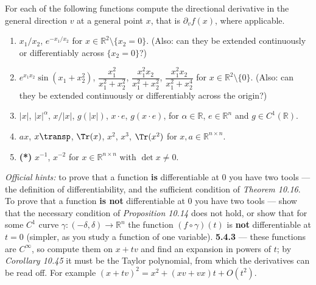 \begin{exercise}
\label{ex:5.4}
For each of the following functions compute the directional derivative in the general direction
$v$ at a general point $x$, that is $\partial_v f(x)$, where applicable.
\begin{enumerate}[label=\textbf{\arabic*.}]
  \item $x_1/x_2$, $e^{-x_1/x_2}$ for $x \in \mathbb{R}^2\setminus\{x_2 = 0\}$. (Also: can they be
    extended continuously or differentiably across $\{x_2 = 0\}$?)
  \item $e^{x_1x_2}\sin(x_1+x_2^2)$, $\dfrac{x_1^2}{x_1^2+x_2^2}$,
    $\dfrac{x_1^2x_2}{x_1^2+x_2^2}$, $\dfrac{x_1^2x_2}{x_1^2+x_2^4}$ for
    $x \in \mathbb{R}^2\setminus\{0\}$. (Also: can they be extended continuously or
    differentiably across the origin?)
  \item $|x|$, $|x|^\alpha$, $x/|x|$, $g(|x|)$, $x\cdot e$, $g(x\cdot e)$, for
    $\alpha \in \mathbb{R}$, $e \in \mathbb{R}^n$ and $g \in C^1(\mathbb{R})$.
  \item $ax$, $x\transp$, $\Tr(x)$, $x^2$, $x^3$, $\Tr(x^2)$ for $x, a \in \mathbb{R}^{n\times n}$.
  \item \textbf{(*)} $x^{-1}$, $x^{-2}$ for $x \in \mathbb{R}^{n\times n}$ with $\det x \neq 0$.
\end{enumerate}
\textit{Official hints:} to prove that a function \textbf{is} differentiable at 0 you have two
tools --- the definition of differentiability, and the sufficient condition of
\textit{Theorem 10.16}. To prove that a function \textbf{is not} differentiable at 0 you have
two tools --- show that the necessary condition of \textit{Proposition 10.14} does not hold, or
show that for some $C^1$ curve $\gamma : (-\delta,\delta)\to\mathbb{R}^n$ the function
$(f\circ\gamma)(t)$ is \textbf{not} differentiable at $t = 0$ (simpler, as you study a function of
one variable). \textbf{5.4.3} --- these functions are $C^\infty$, so compute them on $x+tv$ and
find an expansion in powers of $t$; by \textit{Corollary 10.45} it must be the Taylor polynomial,
from which the derivatives can be read off. For example $(x+tv)^2 = x^2 + (xv+vx)t + O(t^2)$.
\end{exercise}


